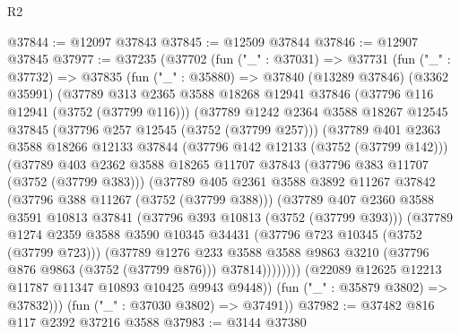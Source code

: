 \begin{lexlean}{R2}
\begin{coremodule}
@37844 := @12097 @37843
@37845 := @12509 @37844
@37846 := @12907 @37845
@37977 := @37235
    (@37702
      (fun ("_" : @37031) =>
      @37731
        (fun ("_" : @37732) =>
        @37835
          (fun ("_" : @35880) =>
          @37840
            (@13289 @37846)
            (@3362 @35991)
            (@37789
              @313
              @2365
              @3588
              @18268
              @12941
              @37846
              (@37796 @116 @12941 (@3752 (@37799 @116)))
              (@37789
                @1242
                @2364
                @3588
                @18267
                @12545
                @37845
                (@37796 @257 @12545 (@3752 (@37799 @257)))
                (@37789
                  @401
                  @2363
                  @3588
                  @18266
                  @12133
                  @37844
                  (@37796 @142 @12133 (@3752 (@37799 @142)))
                  (@37789
                    @403
                    @2362
                    @3588
                    @18265
                    @11707
                    @37843
                    (@37796 @383 @11707 (@3752 (@37799 @383)))
                    (@37789
                      @405
                      @2361
                      @3588
                      @3892
                      @11267
                      @37842
                      (@37796 @388 @11267 (@3752 (@37799 @388)))
                      (@37789
                        @407
                        @2360
                        @3588
                        @3591
                        @10813
                        @37841
                        (@37796 @393 @10813 (@3752 (@37799 @393)))
                        (@37789
                          @1274
                          @2359
                          @3588
                          @3590
                          @10345
                          @34431
                          (@37796 @723 @10345 (@3752 (@37799 @723)))
                          (@37789
                            @1276
                            @233
                            @3588
                            @3588
                            @9863
                            @3210
                            (@37796 @876 @9863 (@3752 (@37799 @876)))
                            @37814))))))))
            (@22089 @12625 @12213 @11787 @11347 @10893 @10425 @9943 @9448))
          (fun ("_" : @35879 @3802) => @37832)))
      (fun ("_" : @37030 @3802) => @37491))
@37982 := @37482 @816 @117 @2392 @37216 @3588
@37983 := @3144 @37380

\end{coremodule}
\end{lexlean}
